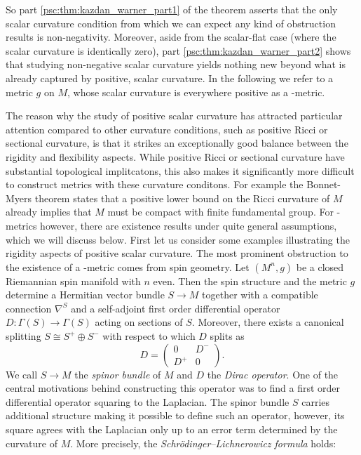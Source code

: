 So part \ref{psc:thm:kazdan_warner_part1} of the theorem asserts that the only scalar curvature condition from which we can expect any kind of obstruction results is non-negativity. Moreover, aside from the scalar-flat case (where the scalar curvature is identically zero), part \ref{psc:thm:kazdan_warner_part2} shows that studying non-negative scalar curvature yields nothing new beyond what is already captured by positive, scalar curvature. In the following we refer to a metric $g$ on $M$, whose scalar curvature is everywhere positive as a \psc-metric.

The reason why the study of positive scalar curvature has attracted particular attention compared to other curvature conditions, such as positive Ricci or sectional curvature, is that it strikes an exceptionally good balance between the rigidity and flexibility aspects. While positive Ricci or sectional curvature have substantial topological implitcatons, this also makes it significantly more difficult to construct metrics with these curvature conditons. For example the Bonnet-Myers theorem states that a positive lower bound on the Ricci curvature of $M$ already implies that $M$ must be compact with finite fundamental group. For \psc-metrics however, there are existence results under quite general assumptions, which we will discuss below. First let us consider some examples illustrating the rigidity aspects of positive scalar curvature. The most prominent obstruction to the existence of a \psc-metric comes from spin geometry. Let $(M^n,g)$ be a closed Riemannian spin manifold with $n$ even. Then the spin structure and the metric $g$ determine a Hermitian vector bundle $S \to M$ together with a compatible connection $\nabla^S$ and a self-adjoint first order differential operator $D \colon \Gamma(S) \to \Gamma(S)$ acting on sections of $S$. Moreover, there exists a canonical splitting $S \cong S^+ \oplus S^-$ with respect to which $D$ splits as
\[
D = \begin{pmatrix}
    0 & D^- \\
    D^+ & 0
\end{pmatrix}.
\]
We call $S \to M$ the \textit{spinor bundle} of $M$ and $D$ the \textit{Dirac operator}. One of the central motivations behind constructing this operator was to find a first order differential operator squaring to the Laplacian. The spinor bundle $S$ carries additional structure making it possible to define such an operator, however, its square agrees with the Laplacian only up to an error term determined by the curvature of $M$. More precisely, the \textit{Schrödinger--Lichnerowicz formula} holds:
